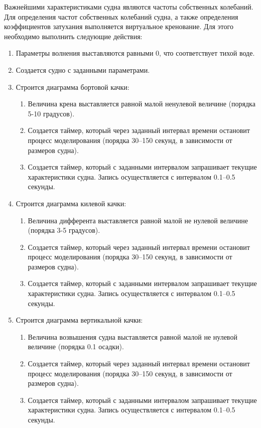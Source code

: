 Важнейшими характеристиками судна являются частоты собственных колебаний.
Для определения частот собственных колебаний судна, а также определения коэффициентов затухания 
выполняется виртуальное кренование. Для этого необходимо выполнить следующие действия:
\begin{enumerate}
	\item	Параметры волнения выставляются равными 0, что соответствует тихой воде.
	\item	Создается судно с заданными параметрами.
	\item	Строится диаграмма бортовой качки:
	\begin{enumerate}
	\item	Величина крена выставляется равной малой ненулевой величине (порядка 5-10 градусов).
	\item	Создается таймер, который через заданный интервал времени остановит процесс
			моделирования (порядка 30--150 секунд, в зависимости от размеров судна).
	\item	Создается таймер, который с заданными интервалом запрашивает текущие 
			характеристики судна. Запись осуществляется с интервалом 0.1--0.5 секунды.
	\end{enumerate}
			
	\item	Строится диаграмма килевой качки:
	\begin{enumerate}
	\item	Величина дифферента выставляется равной малой не нулевой величине (порядка 3-5 градусов).
	\item	Создается таймер, который через заданный интервал времени остановит процесс
			моделирования (порядка 30--150 секунд, в зависимости от размеров судна).
	\item	Создается таймер, который с заданными интервалом запрашивает текущие 
			характеристики судна. Запись осуществляется с интервалом 0.1--0.5 секунды.
	\end{enumerate}
			
	\item	Строится диаграмма вертикальной качки:
	\begin{enumerate}
	\item	Величина возвышения судна выставляется равной малой не нулевой величине (порядка 0.1 осадки).
	\item	Создается таймер, который через заданный интервал времени остановит процесс
			моделирования (порядка 30--150 секунд, в зависимости от размеров судна).
	\item	Создается таймер, который с заданными интервалом запрашивает текущие 
			характеристики судна. Запись осуществляется с интервалом 0.1--0.5 секунды.
	\end{enumerate}
\end{enumerate}

